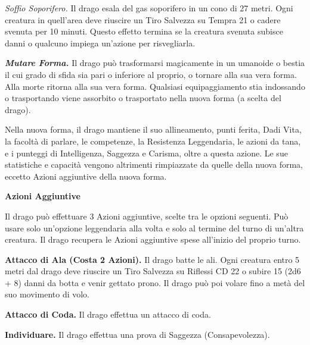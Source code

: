\begin{multicols}{2}
\emph{Soffio Soporifero.} Il drago esala del gas soporifero in un cono di 27 metri. Ogni creatura in quell'area deve riuscire un Tiro Salvezza su Tempra 21 o cadere svenuta per 10 minuti. Questo effetto
termina se la creatura svenuta subisce danni o qualcuno impiega un'azione per risvegliarla.

\emph{\textbf{Mutare Forma.}} Il drago può trasformarsi magicamente in un umanoide o bestia il cui grado di sfida sia pari o inferiore al proprio, o tornare alla sua vera forma. Alla morte ritorna alla sua vera forma. Qualsiasi equipaggiamento stia indossando o trasportando viene assorbito o trasportato nella nuova forma (a scelta del drago).

Nella nuova forma, il drago mantiene il suo allineamento, punti ferita, Dadi Vita, la facoltà di parlare, le competenze, la Resistenza Leggendaria, le azioni da tana, e i punteggi di Intelligenza, Saggezza e Carisma, oltre a questa azione. Le sue statistiche e capacità vengono altrimenti rimpiazzate da quelle della nuova forma, eccetto Azioni aggiuntive della nuova forma.

\textbf{Azioni Aggiuntive}

Il drago può effettuare 3 Azioni aggiuntive, scelte tra le opzioni seguenti. Può usare solo un'opzione leggendaria alla volta e solo al termine del turno di un'altra creatura. Il drago recupera le Azioni aggiuntive spese all'inizio del proprio turno.

\textbf{Attacco di Ala (Costa 2 Azioni).} Il drago batte le ali. Ogni creatura entro 5 metri dal drago deve riuscire un Tiro Salvezza su Riflessi CD 22 o subire 15 (2d6 + 8) danni da botta e venir gettato prono. Il drago può poi volare fino a metà del suo movimento di volo.

\textbf{Attacco di Coda.} Il drago effettua un attacco di coda.

\textbf{Individuare.} Il drago effettua una prova di Saggezza (Consapevolezza).


\end{multicols}

